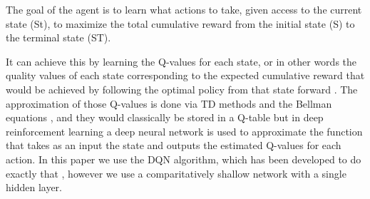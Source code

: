 The goal of the agent is to learn what actions to take, given access to the current state (St), to maximize the total cumulative reward from the initial state (S) to the terminal state (ST).

It can achieve this by learning the Q-values for each state, or in other words the quality values of each state corresponding to the expected cumulative reward that would be achieved by following the optimal policy from that state forward \citep{sutton_barto_2018}. The approximation of those Q-values is done via TD methods and the Bellman equations \citep{sutton_barto_2018}, and they would classically be stored in a Q-table but in deep reinforcement learning a deep neural network is used to approximate the function that takes as an input the state and outputs the estimated Q-values for each action. In this paper we use the DQN algorithm, which has been developed to do exactly that \citep{mnih2015human}, however we use a comparitatively shallow network with a single hidden layer.
